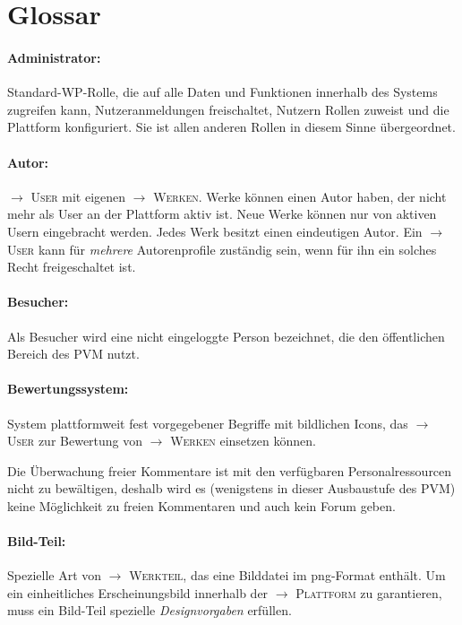 \documentclass[a4paper,11pt]{article}
\newcommand{\glossar}[1]{{$\to$ \textsc{#1}}}
\begin{document}
\section{Glossar} 

\paragraph{Administrator:} 
Standard-WP-Rolle, die auf alle Daten und Funktionen innerhalb des Systems
zugreifen kann, Nutzeranmeldungen freischaltet, Nutzern Rollen zuweist und die
Plattform konfiguriert.  Sie ist allen anderen Rollen in diesem Sinne
übergeordnet.

\paragraph{Autor:} 
\glossar{User} mit eigenen \glossar{Werken}.  Werke können einen Autor haben,
der nicht mehr als User an der Plattform aktiv ist. Neue Werke können nur von
aktiven Usern eingebracht werden. Jedes Werk besitzt einen eindeutigen Autor.
Ein \glossar{User} kann für \emph{mehrere} Autorenprofile zuständig sein, wenn
für ihn ein solches Recht freigeschaltet ist.

\paragraph{Besucher:} 
Als Besucher wird eine nicht eingeloggte Person bezeichnet, die den
öffentlichen Bereich des PVM nutzt.

\paragraph{Bewertungssystem:} 
System plattformweit fest vorgegebener Begriffe mit bildlichen Icons, das
\glossar{User} zur Bewertung von \glossar{Werken} einsetzen können.

Die Überwachung freier Kommentare ist mit den verfügbaren Personalressourcen
nicht zu bewältigen, deshalb wird es (wenigstens in dieser Ausbaustufe des PVM)
keine Möglichkeit zu freien Kommentaren und auch kein Forum geben.  

\paragraph{Bild-Teil:}
Spezielle Art von \glossar{Werkteil}, das eine Bilddatei im png-Format enthält.
Um ein einheitliches Erscheinungsbild innerhalb der \glossar{Plattform} zu
garantieren, muss ein Bild-Teil spezielle \emph{Designvorgaben} erfüllen.
\end{document}
